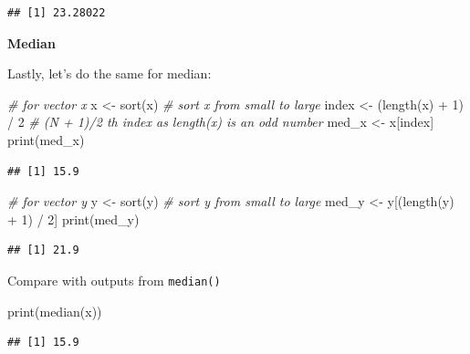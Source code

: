 \documentclass[
]{book}
\newenvironment{Shaded}{\begin{snugshade}}{\end{snugshade}}
\newcommand{\CommentTok}[1]{\textcolor[rgb]{0.56,0.35,0.01}{\textit{#1}}}
\newcommand{\DecValTok}[1]{\textcolor[rgb]{0.00,0.00,0.81}{#1}}
\newcommand{\FunctionTok}[1]{\textcolor[rgb]{0.00,0.00,0.00}{#1}}
\newcommand{\NormalTok}[1]{#1}
\newcommand{\OtherTok}[1]{\textcolor[rgb]{0.56,0.35,0.01}{#1}}
\newcommand{\SpecialCharTok}[1]{\textcolor[rgb]{0.00,0.00,0.00}{#1}}
\begin{document}
\begin{verbatim}
## [1] 23.28022
\end{verbatim}

\textbf{Median}

Lastly, let's do the same for median:

\begin{Shaded}
\begin{Highlighting}[]
\CommentTok{\# for vector x}
\NormalTok{x }\OtherTok{\textless{}{-}} \FunctionTok{sort}\NormalTok{(x) }\CommentTok{\# sort x from small to large}
\NormalTok{index }\OtherTok{\textless{}{-}}\NormalTok{ (}\FunctionTok{length}\NormalTok{(x) }\SpecialCharTok{+} \DecValTok{1}\NormalTok{) }\SpecialCharTok{/} \DecValTok{2} \CommentTok{\# (N + 1)/2 th index as length(x) is an odd number}
\NormalTok{med\_x }\OtherTok{\textless{}{-}}\NormalTok{ x[index]}
\FunctionTok{print}\NormalTok{(med\_x)}
\end{Highlighting}
\end{Shaded}

\begin{verbatim}
## [1] 15.9
\end{verbatim}

\begin{Shaded}
\begin{Highlighting}[]
\CommentTok{\# for vector y}
\NormalTok{y }\OtherTok{\textless{}{-}} \FunctionTok{sort}\NormalTok{(y) }\CommentTok{\# sort y from small to large}
\NormalTok{med\_y }\OtherTok{\textless{}{-}}\NormalTok{ y[(}\FunctionTok{length}\NormalTok{(y) }\SpecialCharTok{+} \DecValTok{1}\NormalTok{) }\SpecialCharTok{/} \DecValTok{2}\NormalTok{]}
\FunctionTok{print}\NormalTok{(med\_y)}
\end{Highlighting}
\end{Shaded}

\begin{verbatim}
## [1] 21.9
\end{verbatim}

Compare with outputs from \texttt{median()}

\begin{Shaded}
\begin{Highlighting}[]
\FunctionTok{print}\NormalTok{(}\FunctionTok{median}\NormalTok{(x))}
\end{Highlighting}
\end{Shaded}

\begin{verbatim}
## [1] 15.9
\end{verbatim}
\end{document}
